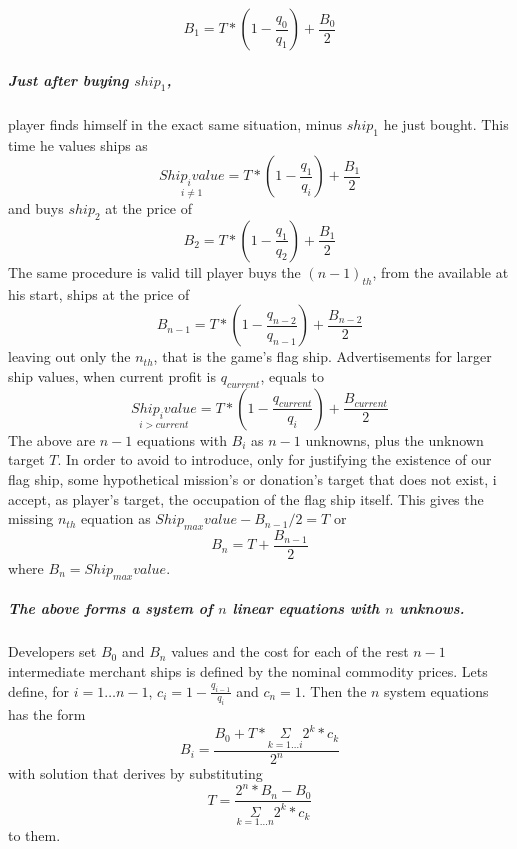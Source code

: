 \documentclass[]{article}
\begin{document}
\[B_{1}=T*(1-\dfrac{q_{0}}{q_{1}})+\dfrac{B_{0}}{2}\]
\subparagraph*{Just after buying $ship_{1}$,} player finds himself in the exact same situation, minus $ship_{1}$ he just bought. This time he values ships as
 \[\underset{i\neq 1}{Ship_{i}value}=T*(1-\dfrac{q_{1}}{q_{i}})+\dfrac{B_{1}}{2}\] and buys $ship_{2}$ at the price of
 \[B_{2}=T*(1-\dfrac{q_{1}}{q_{2}})+\dfrac{B_{1}}{2}\]
 The same procedure is valid till player buys the $(n-1)_{th}$, from the available at his start, ships at the price of 
 \[B_{n-1}=T*(1-\dfrac{q_{n-2}}{q_{n-1}})+\dfrac{B_{n-2}}{2}\] leaving out only the $n_{th}$, that is the game's flag ship. Advertisements for larger ship values, when current profit is $q_{current}$, equals to 
 \[\underset{i > current}{Ship_{i}value}=T*(1-\dfrac{q_{current}}{q_{i}})+\dfrac{B_{current}}{2}\]
 The above are $n-1$ equations with $B_{i}$ as $n-1$ unknowns, plus the unknown target $T$. In order to avoid to introduce, only for justifying the existence of our flag ship, some hypothetical mission's or donation's target that does not exist, i accept, as player's target, the occupation of the flag ship itself. This gives the missing $n_{th}$ equation as $Ship_{max}value-B_{n-1}/2=T$ or
 \[B_{n}=T+\dfrac{B_{n-1}}{2}\] where $B_{n}=Ship_{max}value$.
 \subparagraph*{The above forms a system of $n$ linear equations with $n$ unknows.} Developers set $B_{0}$ and $B_{n}$ values and the cost for each of the rest $n-1$ intermediate merchant ships is defined by the nominal commodity prices. Lets define, for $i=1\ldots n-1$,  $c_{i}=1-\tfrac{q_{i-1}}{q_{i}}$ and $c_{n}=1$. Then the $n$ system equations has the form
 \[B_{i}=\dfrac{B_{0}+T*\underset{k=1\ldots i}{\Sigma} 2^{k}*c_{k}}{2^{n}}\] with solution that derives by substituting
 \[T=\dfrac{2^{n}*B_{n}-B_{0}}{\underset{k=1\ldots n}{\Sigma} 2^{k}*c_{k}}
  \] to them.
\end{document}
